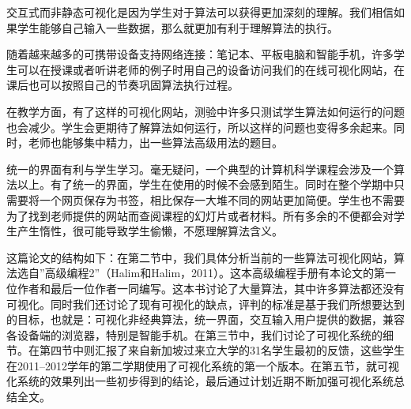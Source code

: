\begin{sectext}
交互式而非静态可视化是因为学生对于算法可以获得更加深刻的理解。我们相信如果学生能够自己输入一些数据，那么就更加有利于理解算法的执行。

随着越来越多的可携带设备支持网络连接：笔记本、平板电脑和智能手机，许多学生可以在授课或者听讲老师的例子时用自己的设备访问我们的在线可视化网站，在课后也可以按照自己的节奏巩固算法执行过程。

在教学方面，有了这样的可视化网站，测验中许多只测试学生算法如何运行的问题也会减少。学生会更期待了解算法如何运行，所以这样的问题也变得多余起来。同时，老师也能够集中精力，出一些算法高级用法的题目。

统一的界面有利与学生学习。毫无疑问，一个典型的计算机科学课程会涉及一个算法以上。有了统一的界面，学生在使用的时候不会感到陌生。同时在整个学期中只需要将一个网页保存为书签，相比保存一大堆不同的网站更加简便。学生也不需要为了找到老师提供的网站而查阅课程的幻灯片或者材料。所有多余的不便都会对学生产生惰性，很可能导致学生偷懒，不愿理解算法含义。

这篇论文的结构如下：在第二节中，我们具体分析当前的一些算法可视化网站，算法选自''高级编程2''（Halim和Halim，2011）。这本高级编程手册有本论文的第一位作者和最后一位作者一同编写。这本书讨论了大量算法，其中许多算法都还没有可视化。同时我们还讨论了现有可视化的缺点，评判的标准是基于我们所想要达到的目标，也就是：可视化非经典算法，统一界面，交互输入用户提供的数据，兼容各设备端的浏览器，特别是智能手机。在第三节中，我们讨论了可视化系统的细节。在第四节中则汇报了来自新加坡过来立大学的31名学生最初的反馈，这些学生在2011--2012学年的第二学期使用了可视化系统的第一个版本。在第五节，就可视化系统的效果列出一些初步得到的结论，最后通过计划近期不断加强可视化系统总结全文。
\end{sectext}
